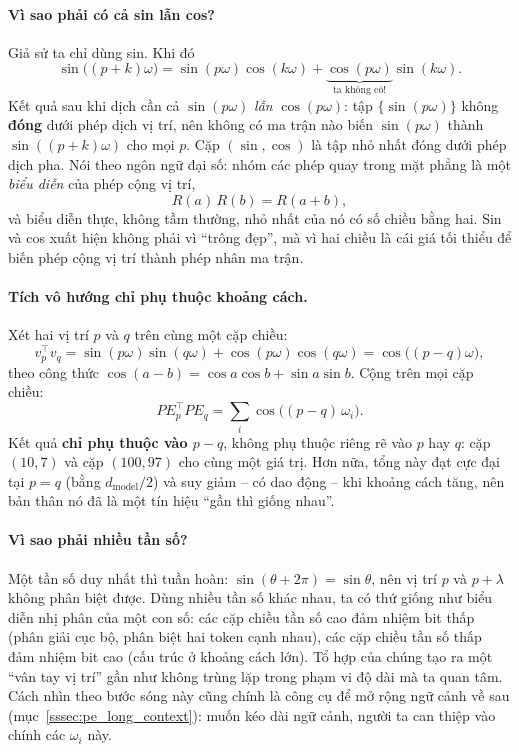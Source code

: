 \paragraph{Vì sao phải có cả sin lẫn cos?} Giả sử ta chỉ dùng sin. Khi đó
\[
\sin\big((p+k)\omega\big) = \sin(p\omega)\cos(k\omega) + \underbrace{\cos(p\omega)}_{\text{ta không có!}}\sin(k\omega).
\]
Kết quả sau khi dịch cần cả $\sin(p\omega)$ \emph{lẫn} $\cos(p\omega)$: tập $\{\sin(p\omega)\}$ không \textbf{đóng} dưới phép dịch vị trí, nên không có ma trận nào biến $\sin(p\omega)$ thành $\sin((p+k)\omega)$ cho mọi $p$. Cặp $(\sin, \cos)$ là tập nhỏ nhất đóng dưới phép dịch pha. Nói theo ngôn ngữ đại số: nhóm các phép quay trong mặt phẳng là một \emph{biểu diễn} của phép cộng vị trí,
\[
R(a)\,R(b) = R(a+b),
\]
và biểu diễn thực, không tầm thường, nhỏ nhất của nó có số chiều bằng hai. Sin và cos xuất hiện không phải vì “trông đẹp”, mà vì hai chiều là cái giá tối thiểu để biến phép cộng vị trí thành phép nhân ma trận.

\paragraph{Tích vô hướng chỉ phụ thuộc khoảng cách.} Xét hai vị trí $p$ và $q$ trên cùng một cặp chiều:
\[
v_p^\top v_q = \sin(p\omega)\sin(q\omega) + \cos(p\omega)\cos(q\omega) = \cos\big((p-q)\omega\big),
\]
theo công thức $\cos(a-b) = \cos a \cos b + \sin a \sin b$. Cộng trên mọi cặp chiều:
\[
PE_p^\top PE_q = \sum_{i} \cos\big((p-q)\,\omega_i\big) .
\]
Kết quả \textbf{chỉ phụ thuộc vào $p-q$}, không phụ thuộc riêng rẽ vào $p$ hay $q$: cặp $(10, 7)$ và cặp $(100, 97)$ cho cùng một giá trị. Hơn nữa, tổng này đạt cực đại tại $p = q$ (bằng $d_{\text{model}}/2$) và suy giảm -- có dao động -- khi khoảng cách tăng, nên bản thân nó đã là một tín hiệu “gần thì giống nhau”.

\paragraph{Vì sao phải nhiều tần số?} Một tần số duy nhất thì tuần hoàn: $\sin(\theta + 2\pi) = \sin\theta$, nên vị trí $p$ và $p + \lambda$ không phân biệt được. Dùng nhiều tần số khác nhau, ta có thứ giống như biểu diễn nhị phân của một con số: các cặp chiều tần số cao đảm nhiệm bit thấp (phân giải cục bộ, phân biệt hai token cạnh nhau), các cặp chiều tần số thấp đảm nhiệm bit cao (cấu trúc ở khoảng cách lớn). Tổ hợp của chúng tạo ra một “vân tay vị trí” gần như không trùng lặp trong phạm vi độ dài mà ta quan tâm. Cách nhìn theo bước sóng này cũng chính là công cụ để mở rộng ngữ cảnh về sau (mục~\ref{sssec:pe_long_context}): muốn kéo dài ngữ cảnh, người ta can thiệp vào chính các $\omega_i$ này.


